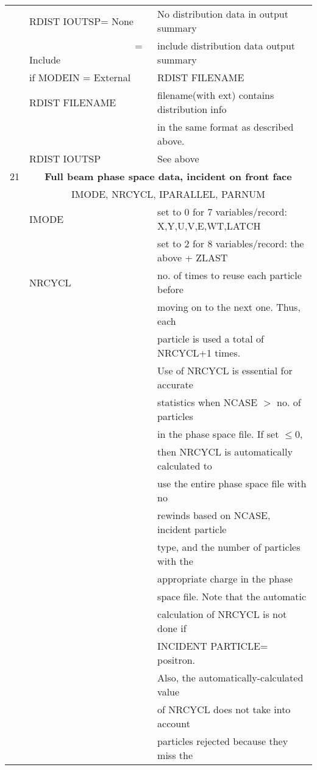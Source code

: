 \begin{longtable}{lll}
  & RDIST IOUTSP= None & No distribution data in output summary\\
  & ~~~~~~~~~~~~~~~~~~~~~ = Include & include distribution data output summary\\
  &if MODEIN = External & RDIST FILENAME \\
  & RDIST FILENAME     & filename(with ext) contains  distribution info\\
  &                   & in the same format as described above.\\
  & RDIST IOUTSP & See above\\
\hline
21&\multicolumn{2}{c}{\bf Full beam phase space data, incident on front face}\\
  &\multicolumn{2}{c}{IMODE, NRCYCL, IPARALLEL, PARNUM}\\
  & IMODE & set to 0 for 7 variables/record: X,Y,U,V,E,WT,LATCH \\
  &  & set to 2 for 8 variables/record: the above + ZLAST \\
  & NRCYCL  & no. of times to reuse each particle before\\
  &         & moving on to the next one.  Thus, each\\
  &         & particle is used a total of NRCYCL+1 times.\\
  &         &  Use of NRCYCL is essential for accurate\\
  &         & statistics when NCASE $>$ no. of particles\\
  &         & in the phase space file.  If set $\leq$0,\\
  &         & then NRCYCL is automatically calculated to\\
  &         & use the entire phase space file with no\\
  &         & rewinds based on NCASE, incident particle\\
  &         & type, and the number of particles with the\\
  &         & appropriate charge in the phase\\
  &         & space file.  Note that the automatic\\
  &         & calculation of NRCYCL is not done if\\
  &         & INCIDENT PARTICLE= positron.\\
  &         & Also, the automatically-calculated value\\
  &         & of NRCYCL does not take into account\\
  &         & particles rejected because they miss the\\

\end{longtable}
